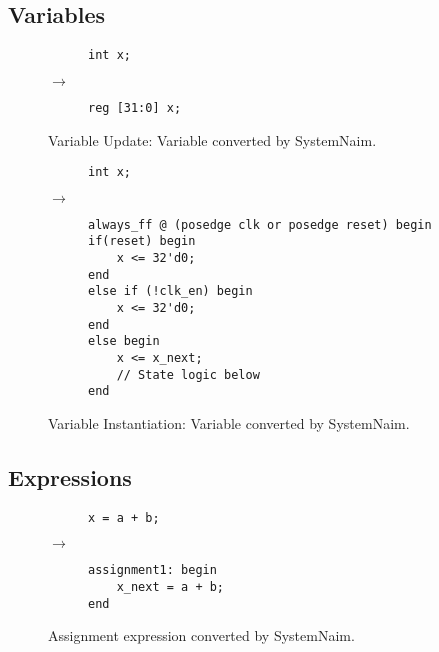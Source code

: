 \subsection{Variables}

\begin{figure}[H]
\centering
\begin{subfigure}{0.15\textwidth}
    \centering
    \begin{verbatim}
int x;
    \end{verbatim}
\end{subfigure}%
{\LARGE$\rightarrow$}%
\begin{subfigure}{0.25\textwidth}
    \begin{verbatim}
reg [31:0] x;
    \end{verbatim}
\end{subfigure}
\caption{Variable Update: Variable converted by SystemNaim.}
\label{sn:var_update}
\end{figure}

\begin{figure}[H]
\centering
\begin{subfigure}{0.15\textwidth}
    \centering
    \begin{verbatim}
int x;
    \end{verbatim}
\end{subfigure}%
{\LARGE$\rightarrow$}%
\begin{subfigure}{0.45\textwidth}
    \begin{verbatim}
always_ff @ (posedge clk or posedge reset) begin
if(reset) begin
    x <= 32'd0;
end
else if (!clk_en) begin
    x <= 32'd0;
end
else begin
    x <= x_next;
    // State logic below
end
    \end{verbatim}
\end{subfigure}
\caption{Variable Instantiation: Variable converted by SystemNaim.}
\label{sn:var}
\end{figure}

\subsection{Expressions}

\begin{figure}[H]
\centering
\begin{subfigure}{0.2\textwidth}
    \centering
    \begin{verbatim}
x = a + b;
    \end{verbatim}
\end{subfigure}%
{\LARGE$\rightarrow$}%
\begin{subfigure}{0.3\textwidth}
    \begin{verbatim}
assignment1: begin
    x_next = a + b;
end
    \end{verbatim}
\end{subfigure}
\caption{Assignment expression converted by SystemNaim.}
\label{sn:expr}
\end{figure}

